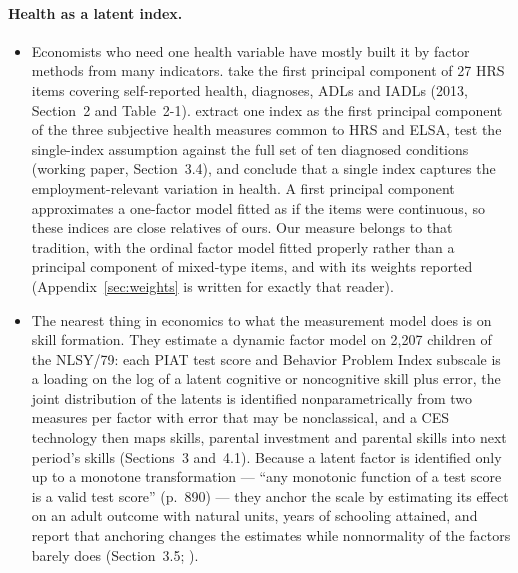 \documentclass[11pt]{article}
\begin{document}
\paragraph{Health as a latent index.}
\begin{itemize}
\item Economists who need one health variable have mostly built it by factor methods from many indicators. \citet{poterba2013,poterba2017} take the first principal component of 27 HRS items covering self-reported health, diagnoses, ADLs and IADLs (2013, Section~2 and Table~2-1). \citet{blundell2023} extract one index as the first principal component of the three subjective health measures common to HRS and ELSA, test the single-index assumption against the full set of ten diagnosed conditions (working paper, Section~3.4), and conclude that a single index captures the employment-relevant variation in health. A first principal component approximates a one-factor model fitted as if the items were continuous, so these indices are close relatives of ours. Our measure belongs to that tradition, with the ordinal factor model fitted properly rather than a principal component of mixed-type items, and with its weights reported (Appendix~\ref{sec:weights} is written for exactly that reader).
\item The nearest thing in economics to what the measurement model does is \citet{cunha2010} on skill formation. They estimate a dynamic factor model on 2,207 children of the NLSY/79: each PIAT test score and Behavior Problem Index subscale is a loading on the log of a latent cognitive or noncognitive skill plus error, the joint distribution of the latents is identified nonparametrically from two measures per factor with error that may be nonclassical, and a {CES} technology then maps skills, parental investment and parental skills into next period's skills (Sections~3 and~4.1). Because a latent factor is identified only up to a monotone transformation --- ``any monotonic function of a test score is a valid test score'' (p.~890) --- they anchor the scale by estimating its effect on an adult outcome with natural units, years of schooling attained, and report that anchoring changes the estimates while nonnormality of the factors barely does (Section~3.5; \citealp{cunha2008}).

\end{itemize}
\end{document}
